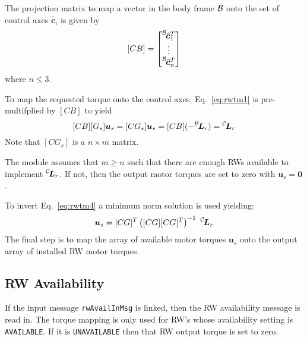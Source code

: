 The projection matrix to map a vector in the body frame $\cal B$ onto the set of control axes $\hat{\bm c}_{i}$ is given by
\begin{equation}
	\label{eq:rwtm3}
	[CB] = \begin{bmatrix}
		\leftexp{B}{\hat{\bm c}}_{1}^{T}
		\\
		\vdots \\
		\leftexp{B}{\hat{\bm c}}_{n}^{T}
	\end{bmatrix}
\end{equation}
where $n \le 3$.  

To map the requested torque onto the control axes, Eq.~\eqref{eq:rwtm1} is pre-multifplied by $[CB]$ to yield
\begin{equation}
	\label{eq:rwtm4}
	[CB][G_{s}] \bm u_{s} = [CG_{s}] \bm u_{s} = [CB](-\leftexp{B}{\bm L}_r) = \leftexp{C}{\bm L}_{r}
\end{equation}
Note that $[CG_{s}]$ is a $n\times m$ matrix.  

The module assumes that $m\ge n$ such that there are enough RWs available to implement $ \leftexp{C}{\bm L}_{r}$.  If not, then the output motor torques are set to zero with $\bm u_{s} = \bm 0$.  

To invert Eq.~\eqref{eq:rwtm4} a minimum norm solution is used yielding: 
\begin{equation}
 \bm u_{s}  = [CG]^T \left([CG][CG]^T\right)^{-1}\  \leftexp{C}{\bm L}_{r}
\end{equation}
The final step is to map the array of available motor torques $\bm u_{s}$ onto the output array of installed RW motor torques.  


\subsection{RW Availability} 
If the input message  {\tt rwAvailInMsg} is linked, then the RW availability message is read in. The torque mapping is only used for RW's whose availability setting is {\tt AVAILABLE}.  If it is {\tt UNAVAILABLE} then that RW output torque is set to zero.  


